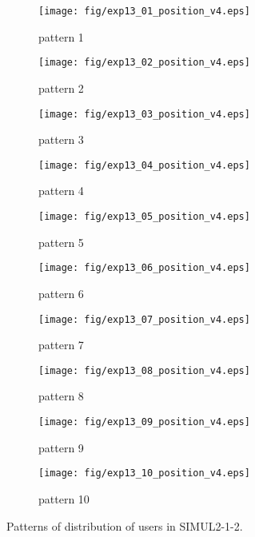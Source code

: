 \begin{figure}
	\begin{center}
		\begin{subfigure}[b]{0.32\textwidth}
			\texttt{[image: fig/exp13\_01\_position\_v4.eps]}
			\caption{pattern 1}
			\label{figure:simul2_1_2_a}
		\end{subfigure}
		\begin{subfigure}[b]{0.32\textwidth}
			\texttt{[image: fig/exp13\_02\_position\_v4.eps]}
			\caption{pattern 2}
			\label{figure:simul2_1_2_b}
		\end{subfigure}
		\begin{subfigure}[b]{0.32\textwidth}
			\texttt{[image: fig/exp13\_03\_position\_v4.eps]}
			\caption{pattern 3}
			\label{figure:simul2_1_2_c}
		\end{subfigure}
		\begin{subfigure}[b]{0.32\textwidth}
			\texttt{[image: fig/exp13\_04\_position\_v4.eps]}
			\caption{pattern 4}
			\label{figure:simul2_1_2_d}
		\end{subfigure}
		\begin{subfigure}[b]{0.32\textwidth}
			\texttt{[image: fig/exp13\_05\_position\_v4.eps]}
			\caption{pattern 5}
			\label{figure:simul2_1_2_e}
		\end{subfigure}
		\begin{subfigure}[b]{0.32\textwidth}
			\texttt{[image: fig/exp13\_06\_position\_v4.eps]}
			\caption{pattern 6}
			\label{figure:simul2_1_2_f}
		\end{subfigure}
		\begin{subfigure}[b]{0.32\textwidth}
			\texttt{[image: fig/exp13\_07\_position\_v4.eps]}
			\caption{pattern 7}
			\label{figure:simul2_1_2_g}
		\end{subfigure}
		\begin{subfigure}[b]{0.32\textwidth}
			\texttt{[image: fig/exp13\_08\_position\_v4.eps]}
			\caption{pattern 8}
			\label{figure:simul2_1_2_h}
		\end{subfigure}
		\begin{subfigure}[b]{0.32\textwidth}
			\texttt{[image: fig/exp13\_09\_position\_v4.eps]}
			\caption{pattern 9}
			\label{figure:simul2_1_2_i}
		\end{subfigure}
		\begin{subfigure}[b]{0.32\textwidth}
			\texttt{[image: fig/exp13\_10\_position\_v4.eps]}
			\caption{pattern 10}
			\label{figure:simul2_1_2_j}
		\end{subfigure}
		\caption{Patterns of distribution of users in SIMUL2-1-2.}
		\label{figure:simul2_1_2_p}
	\end{center}
\end{figure}

